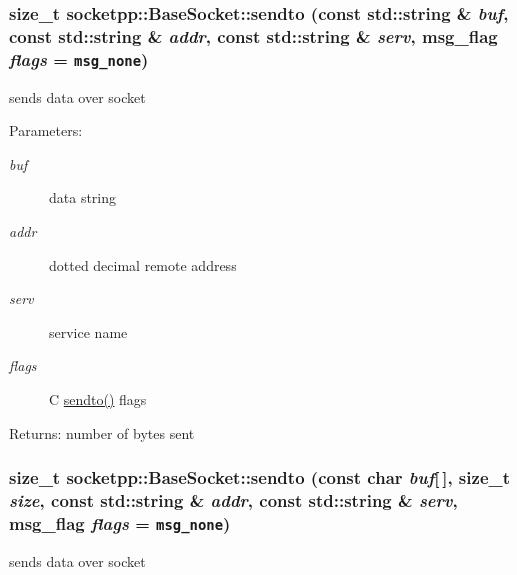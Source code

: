\begin{CompactItemize}
{\subsubsection[{sendto}]{\setlength{\rightskip}{0pt plus 5cm}size\_\-t socketpp::BaseSocket::sendto (const std::string \& {\em buf}, \/  const std::string \& {\em addr}, \/  const std::string \& {\em serv}, \/  msg\_\-flag {\em flags} = {\tt msg\_\-none})}}
\label{classsocketpp_1_1BaseSocket_1bcaa3e5552273e0ef51811bd6987dc8}


sends data over socket 

\begin{Desc}
\item[Parameters:]
\begin{description}
\item[{\em buf}]data string \item[{\em addr}]dotted decimal remote address \item[{\em serv}]service name \item[{\em flags}]C \hyperlink{classsocketpp_1_1BaseSocket_d6df36281c6fce81e5c4c493ac91a6f8}{sendto()} flags \end{description}
\end{Desc}
\begin{Desc}
\item[Returns:]number of bytes sent \end{Desc}
\hypertarget{classsocketpp_1_1BaseSocket_d12f0e8c85c766765fe9d88dc4833dcc}{
\subsubsection[{sendto}]{\setlength{\rightskip}{0pt plus 5cm}size\_\-t socketpp::BaseSocket::sendto (const char {\em buf}\mbox{[}$\,$\mbox{]}, \/  size\_\-t {\em size}, \/  const std::string \& {\em addr}, \/  const std::string \& {\em serv}, \/  msg\_\-flag {\em flags} = {\tt msg\_\-none})}}
\label{classsocketpp_1_1BaseSocket_d12f0e8c85c766765fe9d88dc4833dcc}


sends data over socket 


\end{CompactItemize}
